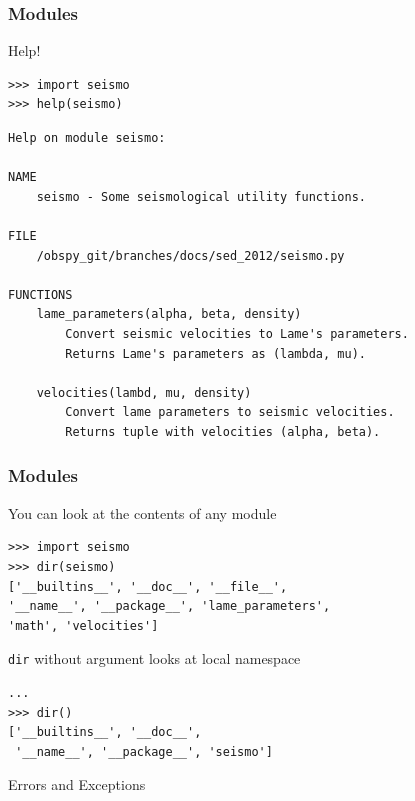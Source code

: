 \begin{frame}[fragile]
\frametitle{Modules}
Help!
\begin{myColorBox}{1.0}{}
\begin{verbatim}
>>> import seismo
>>> help(seismo)
\end{verbatim}
\end{myColorBox}
\begin{myColorBox}{1.0}{}
\begin{verbatim}
Help on module seismo:

NAME
    seismo - Some seismological utility functions.

FILE
    /obspy_git/branches/docs/sed_2012/seismo.py

FUNCTIONS
    lame_parameters(alpha, beta, density)
        Convert seismic velocities to Lame's parameters.
        Returns Lame's parameters as (lambda, mu).
    
    velocities(lambd, mu, density)
        Convert lame parameters to seismic velocities.
        Returns tuple with velocities (alpha, beta).

\end{verbatim}
\end{myColorBox}
\end{frame}

\begin{frame}[fragile]
\frametitle{Modules}
You can look at the contents of any module
\begin{myColorBox}{0.9}{}
\begin{verbatim}
>>> import seismo
>>> dir(seismo)
['__builtins__', '__doc__', '__file__', 
'__name__', '__package__', 'lame_parameters', 
'math', 'velocities']

\end{verbatim}
\end{myColorBox}
\verb#dir# without argument looks at local namespace
\begin{myColorBox}{0.9}{}
\begin{verbatim}
... 
>>> dir()
['__builtins__', '__doc__',
 '__name__', '__package__', 'seismo']
\end{verbatim}
\end{myColorBox}
\end{frame}

\begin{frame}
    \begin{center}
    \Huge{Errors and Exceptions}
    \end{center}
\end{frame}

